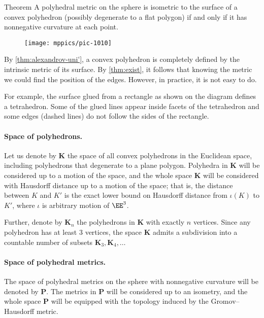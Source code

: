 \begin{thm}{Theorem}\label{thm:exist}
A polyhedral metric on the sphere is isometric to the surface of a convex polyhedron (possibly degenerate to a flat polygon) if and only if it has nonnegative curvature at each point.
\end{thm}

\begin{wrapfigure}{r}{30mm}
\vskip-5mm
\centering
\texttt{[image: mppics/pic-1010]}
\vskip-0mm
\end{wrapfigure}

By \ref{thm:alexandrov-uni'}, a convex polyhedron is completely defined by the intrinsic metric of its surface.
By \ref{thm:exist}, it follows that knowing the metric we could find the position of the edges.
However, in practice, it is not easy to do.

For example, the surface glued from a rectangle as shown on the diagram defines a tetrahedron.
Some of the glued lines appear inside facets of the tetrahedron and some edges (dashed lines) do not follow the sides of the rectangle.

\paragraph{Space of polyhedrons.}
Let us denote by $\mathbf{K}$ the space of all convex polyhedrons in the Euclidean space,
including polyhedrons that degenerate to a plane polygon.
Polyhedra in $\mathbf{K}$ will be considered up to a motion of the space,
and the whole space $\mathbf{K}$ will be considered with Hausdorff distance up to a motion of the space;
that is, the distance between $K$ and $K'$ is the exact lower bound on Hausdorff distance from $\iota(K)$ to $K'$, where $\iota$ is arbitrary motion of $\EE^3$.

Further, denote by $\mathbf{K}_n$ the polyhedrons in $\mathbf{K}$ with exactly $n$ vertices.
Since any polyhedron has at least 3 vertices, the space $\mathbf{K}$ admits a subdivision into a countable number of subsets $\mathbf{K}_3,\mathbf{K}_4,\dots$

\paragraph{Space of polyhedral metrics.}
The space of polyhedral metrics on the sphere with nonnegative curvature will be denoted by $\mathbf{P}$.
The metrics in $\mathbf{P}$ will be considered up to an isometry, and the whole space $\mathbf{P}$ will be equipped with the topology induced by the Gromov--Hausdorff metric.

